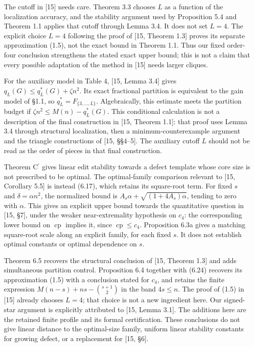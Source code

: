 \documentclass[english,11pt,a4paper]{article}
\begin{document}
The cutoff in {[}15{]} needs care. Theorem 3.3 chooses \(L\) as a function of the localization accuracy, and the stability argument used by Proposition 5.4 and Theorem 1.1 applies that cutoff through Lemma 3.4. It does not set \(L=4\). The explicit choice \(L=4\) following the proof of {[}15, Theorem 1.3{]} proves its separate approximation (1.5), not the exact bound in Theorem 1.1. Thus our fixed order-four conclusion strengthens the stated exact upper bound; this is not a claim that every possible adaptation of the method in {[}15{]} needs larger cliques.

For the auxiliary model in Table 4, {[}15, Lemma 3.4{]} gives \(q_L(G)\le q_L^*(G)+\zeta n^2\). Its exact fractional partition is equivalent to the gain model of §1.1, so \(q_L^*=F_{\{3,\ldots,L\}}\). Algebraically, this estimate meets the partition budget if \(\zeta n^2\le M(n)-q_L^*(G)\). This conditional calculation is not a description of the final construction in {[}15, Theorem 1.1{]}: that proof uses Lemma 3.4 through structural localization, then a minimum-counterexample argument and the triangle constructions of {[}15, §§4--5{]}. The auxiliary cutoff \(L\) should not be read as the order of pieces in that final construction.

Theorem \texorpdfstring{C\ensuremath{^{\prime}}}{C'} gives linear edit stability towards a defect template whose core size is not prescribed to be optimal. The optimal-family comparison relevant to {[}15, Corollary 5.5{]} is instead (6.17), which retains its square-root term. For fixed \(s\) and \(\delta=\alpha n^2\), the normalized bound is \(A_s\alpha+\sqrt{(1+4A_s)\alpha}\), tending to zero with \(\alpha\). This gives an explicit upper bound towards the quantitative question in {[}15, §7{]}, under the weaker near-extremality hypothesis on \(c_4\): the corresponding lower bound on \(\operatorname{cp}\) implies it, since \(\operatorname{cp}\le c_4\). Proposition 6.3a gives a matching square-root scale along an explicit family, for each fixed \(s\). It does not establish optimal constants or optimal dependence on \(s\).

Theorem 6.5 recovers the structural conclusion of {[}15, Theorem 1.3{]} and adds simultaneous partition control. Proposition 6.4 together with (6.24) recovers its approximation (1.5) with a conclusion stated for \(c_4\), and retains the finite expression \(M(n-s)+ns-\binom{s+1}{2}\) in the band \(4s\le n\). The proof of (1.5) in {[}15{]} already chooses \(L=4\); that choice is not a new ingredient here. Our signed-star argument is explicitly attributed to {[}15, Lemma 3.1{]}. The additions here are the retained finite profile and its formal certification. These conclusions do not give linear distance to the optimal-size family, uniform linear stability constants for growing defect, or a replacement for {[}15, §6{]}.
\end{document}
